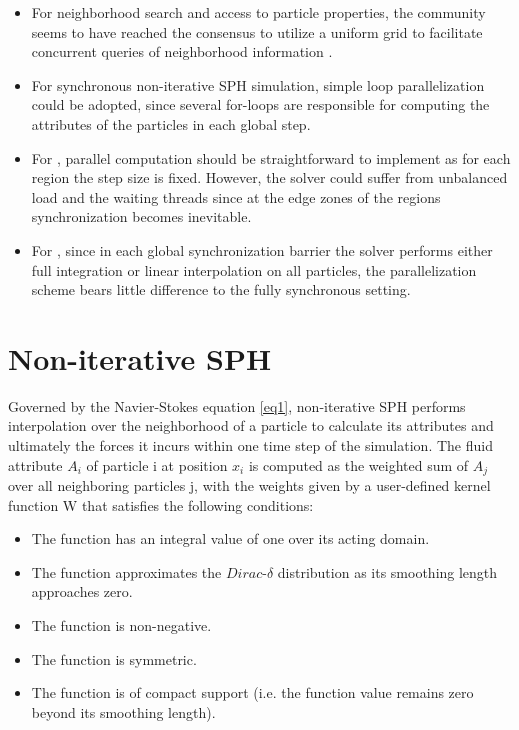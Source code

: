 \documentclass[
	11pt, 
	DIV10,
	ngerman,
	a4paper, 
	oneside, 
	headings=normal, 
	captions=tableheading,
	final, 
	numbers=noenddot
]{scrartcl}
\begin{document}
\begin{itemize}
    \item For neighborhood search and access to particle properties, the community seems to have reached the consensus to utilize a uniform grid to facilitate concurrent queries of neighborhood information \cite{ihmsen2014sph}.
    \item For synchronous non-iterative SPH simulation, simple loop parallelization could be adopted, since several for-loops are responsible for computing the attributes of the particles in each global step.
    \item For \cite{goswami2014regional}, parallel computation should be straightforward to implement as for each region the step size is fixed. However, the solver could suffer from unbalanced load and the waiting threads since at the edge zones of the regions synchronization becomes inevitable.
    \item For \cite{ban2018adaptively}, since in each global synchronization barrier the solver performs either full integration or linear interpolation on all particles, the parallelization scheme bears little difference to the fully synchronous setting.
\end{itemize}

\section{Non-iterative SPH}

Governed by the Navier-Stokes equation \eqref{eq1}, non-iterative SPH performs interpolation over the neighborhood of a particle to calculate its attributes and ultimately the forces it incurs within one time step of the simulation. The fluid attribute $ A_{i} $ of particle i at position $ x_{i} $ is computed as the weighted sum of  $ A_{j} $ over all neighboring particles j, with the weights given by a user-defined kernel function W that satisfies the following conditions:

\begin{itemize}
    \item The function has an integral value of one over its acting domain.
    \item The function approximates the $ Dirac $-$ \delta $ distribution as its smoothing length approaches zero.
    \item The function is non-negative.
    \item The function is symmetric.
    \item The function is of compact support (i.e. the function value remains zero beyond its smoothing length).
\end{itemize}
\end{document}
